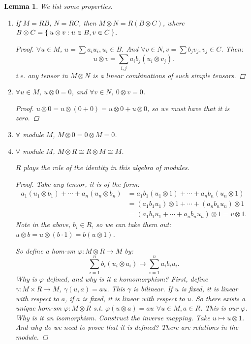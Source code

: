 \documentclass[12pt]{amsbook}
\theoremstyle{plain}
\numberwithin{section}{chapter}
\numberwithin{equation}{chapter}
\newtheorem{lem}[theorem]{Lemma}
\theoremstyle{definition}
\theoremstyle{remark}
\newcommand{\bee}{\begin{equation}\begin{aligned}}
\newcommand{\eee}{\end{aligned}\end{equation}}
\newcommand{\ten}{\otimes} %
\newcommand{\tens}{\otimes}
\renewcommand{\phi}{\varphi}
\begin{document}
\begin{lem}
We list some properties. 
\begin{enumerate}
\item If $M = RB$, $N = RC$, then $M \otimes N = R(B \otimes C)$, where $B \otimes C = \Set{u\otimes v:u \in B,v \in C}$. 
\begin{proof}
$\forall u \in M$, $u = \sum a_iu_i,u_i \in B$. And $\forall v \in N, v = \sum b_jv_j,v_j \in C$. Then:
$$
u \otimes v = \sum_{i,j}a_ib_j(u_i \otimes v_j).
$$
i.e. any tensor in $M \otimes N$ is a linear combinations of such simple tensors. 
\end{proof}
\item $\forall u \in M$, $u \otimes 0 = 0$, and $\forall v \in N$, $0 \otimes v = 0$. 

\begin{proof}
$u \otimes 0 = u \otimes (0 + 0) = u \otimes 0 + u \otimes 0$, so we must have that it is zero. 
\end{proof}

\item $\forall$ module $M$, $M \otimes 0 = 0 \otimes M = 0$. 

\item $\forall$ module $M$, $M \otimes R \cong R \otimes M \cong M$. 

$R$ plays the role of the identity in this algebra of modules. 

\begin{proof}
Take any tensor, it is of the form: 
\bee \label{eqn10.17}
a_1(u_1 \otimes b_1) + \cdots + a_n(u_n \otimes b_n) &= a_1b_1(u_1 \otimes 1) + \cdots + a_nb_n(u_n \otimes 1)\\
&= (a_1b_1u_1) \otimes 1 + \cdots + (a_nb_nu_n) \otimes 1\\
&= (a_1b_1u_1 + \cdots + a_nb_nu_n) \otimes 1 = v \otimes 1.
\eee
Note in the above, $b_i \in R$, so we can take them out: $u \otimes b = u \otimes (b \cdot 1) = b(u \otimes 1)$. 

So define a hom-sm $\phi:M \ten R \to M$ by: 
$$
\sum_{i = 1}^n b_i(u_i \ten a_i) \mapsto \sum_{i = 1}^n a_ib_iu_i.
$$
Why is $\phi$ defined, and why is it a homomorphism? First, define $\gamma: M \times R \to M$, $\gamma(u,a) = au$. This $\gamma$ is bilinear. If $u$ is fixed, it is linear with respect to $a$, if $a$ is fixed, it is linear with respect to $u$. So there exists a unique hom-sm $\phi: M \tens
R$ s.t. $\phi(u \tens a) = au$ $\forall u \in M,a \in R$. This is our $\phi$. Why is it an isomorphism. Construct the inverse mapping. Take $u \mapsto u \tens 1$. And why do we need to prove that it is defined? There are relations in the module. 


\end{proof}
\end{enumerate}
\end{lem}
\end{document}
